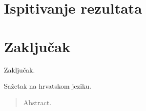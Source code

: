 \documentclass[times, utf8, zavrsni]{fer}
\begin{document}
\chapter{Ispitivanje rezultata}

\chapter{Zaključak}
Zaključak.




\begin{sazetak}
Sažetak na hrvatskom jeziku.

\end{sazetak}

\begin{abstract}
Abstract.	

\end{abstract}
\end{document}
